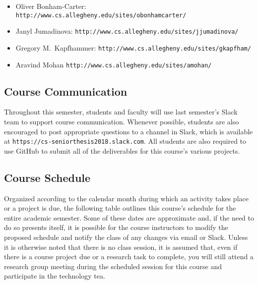 \documentclass[11pt]{article}
\newcommand{\url}[1]{\lstinline{#1}}
\begin{document}
\vspace*{-.1in}
\begin{itemize}
  \itemsep -.25em
  \item Oliver Bonham-Carter: \url{http://www.cs.allegheny.edu/sites/obonhamcarter/}
  \item Janyl Jumadinova: \url{http://www.cs.allegheny.edu/sites/jjumadinova/}
  \item Gregory M.\ Kapfhammer: \url{http://www.cs.allegheny.edu/sites/gkapfham/}
  \item Aravind Mohan \url{http://www.cs.allegheny.edu/sites/amohan/}
\end{itemize}

\vspace*{-.25in}
\subsection*{Course Communication}

Throughout this semester, students and faculty will use last semester's Slack
team to support course communication. Whenever possible, students are also
encouraged to post appropriate questions to a channel in Slack, which is
available at \url{https://cs-seniorthesis2018.slack.com}. All students are also
required to use GitHub to submit all of the deliverables for this course's
various projects.

\vspace*{-.1in}
\subsection*{Course Schedule}

Organized according to the calendar month during which an activity takes place
or a project is due, the following table outlines this course's schedule for
the entire academic semester. Some of these dates are approximate and, if the
need to do so presents itself, it is possible for the course instructors to
modify the proposed schedule and notify the class of any changes via email or
Slack. Unless it is otherwise noted that there is no class session, it is
assumed that, even if there is a course project due or a research task to
complete, you will still attend a research group meeting during the scheduled
session for this course and participate in the technology tea.
\end{document}
